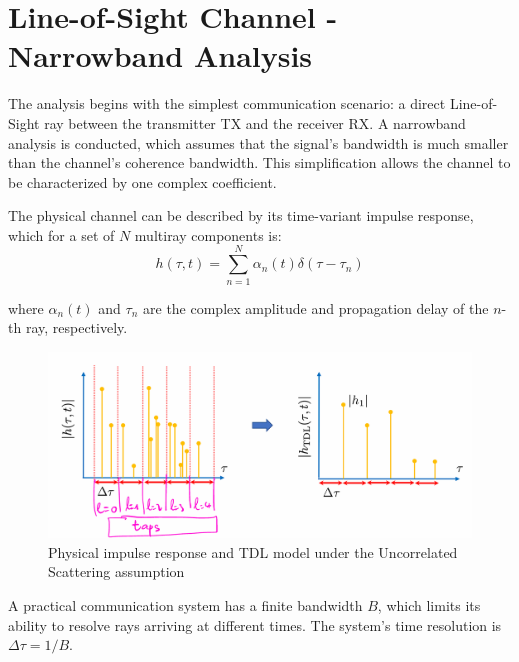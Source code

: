 \chapter{Line-of-Sight Channel - Narrowband Analysis}
\label{chap:los}

The analysis begins with the simplest communication scenario: a direct Line-of-Sight ray between the transmitter TX and the receiver RX. A narrowband analysis is conducted, which assumes that the signal's bandwidth is much smaller than the channel's coherence bandwidth. This simplification allows the channel to be characterized by one complex coefficient.

The physical channel can be described by its time-variant impulse response, which for a set of $N$ multiray components is:
\begin{equation}
	h(\tau,t) = \sum_{n=1}^{N} \alpha_n(t) \delta(\tau - \tau_n)
\end{equation}

where $\alpha_n(t)$ and $\tau_n$ are the complex amplitude and propagation delay of the $n$-th ray, respectively.

\begin{figure}[H]
	\centering
	\includegraphics[width=\linewidth]{content/4-images/taps}
	\caption[Physical impulse response and TDL model under the Uncorrelated Scattering assumption]{Physical impulse response and TDL model under the Uncorrelated Scattering assumption\footnotemark}
	\label{fig:taps}
\end{figure}

A practical communication system has a finite bandwidth $B$, which limits its ability to resolve rays arriving at different times. The system's time resolution is $\Delta\tau = 1/B$. 


